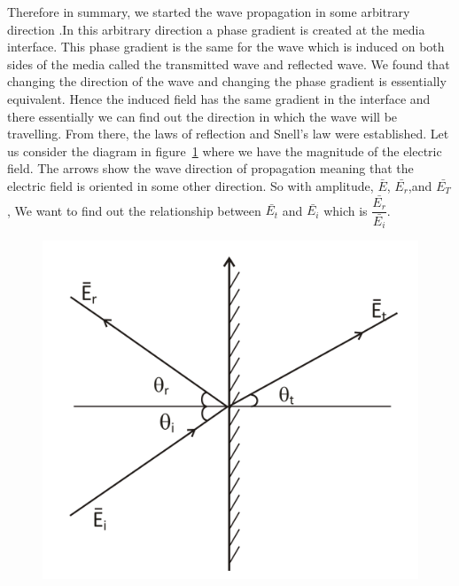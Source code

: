 Therefore in summary, we started the wave propagation in some arbitrary direction .In this arbitrary direction a phase gradient is created at the media interface. This phase gradient is the same for the wave which is induced on both sides of the media called the transmitted wave and reflected wave. We found that changing the direction of the wave and changing the phase gradient is essentially equivalent. Hence the induced field has the same gradient in the interface and there essentially we can find out the direction in which the wave will be travelling. From there, the laws of reflection and Snell's law were established. Let us consider the diagram in figure~\ref{fig:group30f} where we have the magnitude of the electric field. The arrows show the wave direction of propagation meaning that the electric field is oriented in some other direction. So with amplitude, $\bar{E}$, $\bar{E_r}$,and $\bar{E_T}$, We want to find out the relationship between $\bar{E_t}$ and $\bar{E_i}$ which is $\dfrac{\bar{E_r}}{\bar{E_i}}$.
\begin{figure}[h]
\centering
\includegraphics[width=.7\linewidth]{./graphics/group30f}
\caption{}
\label{fig:group30f}
\end{figure}


